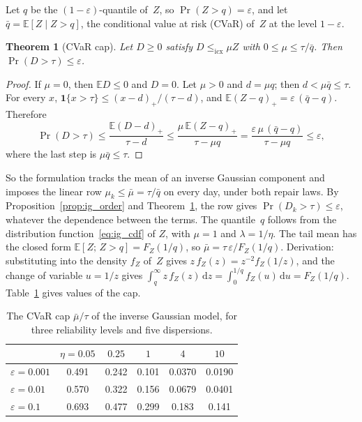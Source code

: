 \documentclass[11pt,a4paper]{article}
\theoremstyle{plain}
\newtheorem{theorem}{Theorem}[section]
\theoremstyle{definition}
\theoremstyle{remark}
\begin{document}
Let $q$ be the $(1-\varepsilon)$-quantile of~$Z$, so $\Pr(Z > q) = \varepsilon$, and let $\bar q = \mathbb{E}[Z \mid Z > q]$, the conditional value at risk (CVaR) of~$Z$ at the level $1-\varepsilon$.

\begin{theorem}[CVaR cap]\label{thm:ig_cap}
Let $D \ge 0$ satisfy $D \le_{\mathrm{icx}} \mu Z$ with $0 \le \mu \le \tau/\bar q$.
Then $\Pr(D > \tau) \le \varepsilon$.
\end{theorem}
\begin{proof}
If $\mu = 0$, then $\mathbb{E}D \le 0$ and $D = 0$.
Let $\mu > 0$ and $d = \mu q$; then $d < \mu\bar q \le \tau$.
For every $x$, $\mathbf{1}\{x > \tau\} \le (x-d)_+/(\tau - d)$, and $\mathbb{E}(Z - q)_+ = \varepsilon\,(\bar q - q)$.
Therefore
\[
  \Pr(D > \tau)
  \le \frac{\mathbb{E}(D-d)_+}{\tau - d}
  \le \frac{\mu\,\mathbb{E}(Z-q)_+}{\tau - \mu q}
  = \frac{\varepsilon\,\mu\,(\bar q - q)}{\tau - \mu q}
  \le \varepsilon,
\]
where the last step is $\mu\bar q \le \tau$.
\end{proof}

So the formulation tracks the mean of an inverse Gaussian component and imposes the linear row $\mu_k \le \bar\mu = \tau/\bar q$ on every day, under both repair laws.
By Proposition~\ref{prop:ig_order} and Theorem~\ref{thm:ig_cap}, the row gives $\Pr(D_k > \tau) \le \varepsilon$, whatever the dependence between the terms.
The quantile~$q$ follows from the distribution function~\eqref{eq:ig_cdf} of $Z$, with $\mu = 1$ and $\lambda = 1/\eta$.
The tail mean has the closed form $\mathbb{E}[Z;\, Z > q] = F_Z(1/q)$, so $\bar\mu = \tau\,\varepsilon/F_Z(1/q)$.
Derivation: substituting into the density $f_Z$ of~$Z$ gives $z\,f_Z(z) = z^{-2} f_Z(1/z)$, and the change of variable $u = 1/z$ gives $\int_q^\infty z\, f_Z(z)\, \mathrm{d}z = \int_0^{1/q} f_Z(u)\, \mathrm{d}u = F_Z(1/q)$.
Table~\ref{tab:ig_cap} gives values of the cap.

\begin{table}[htbp]
\centering
\caption{The CVaR cap $\bar\mu/\tau$ of the inverse Gaussian model, for three reliability levels and five dispersions.}
\label{tab:ig_cap}
\small
\begin{tabular}{@{}lccccc@{}}
\toprule
 & $\eta = 0.05$ & $0.25$ & $1$ & $4$ & $10$ \\
\midrule
$\varepsilon = 0.001$ & 0.491 & 0.242 & 0.101 & 0.0370 & 0.0190 \\
$\varepsilon = 0.01$ & 0.570 & 0.322 & 0.156 & 0.0679 & 0.0401 \\
$\varepsilon = 0.1$ & 0.693 & 0.477 & 0.299 & 0.183 & 0.141 \\
\bottomrule
\end{tabular}
\end{table}
\end{document}
